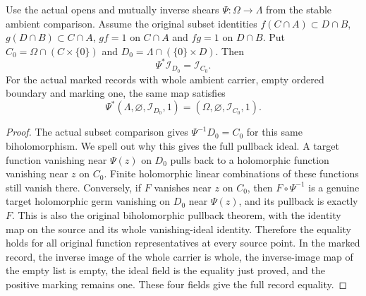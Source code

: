 \begin{lemma}
\label{hir:actual-stable-plane-whole-ideal}
\leanok
Use the actual opens and mutually inverse shears $\Psi:\Omega\to\Lambda$
from the stable ambient comparison. Assume the original subset identities
$f(C\cap A)\subset D\cap B$, $g(D\cap B)\subset C\cap A$, $gf=1$ on
$C\cap A$ and $fg=1$ on $D\cap B$. Put
$C_0=\Omega\cap(C\times\{0\})$ and
$D_0=\Lambda\cap(\{0\}\times D)$. Then
\[
 \Psi^*\mathcal I_{D_0}=\mathcal I_{C_0}.
\]
For the actual marked records with whole ambient carrier, empty ordered
boundary and marking one, the same map satisfies
\[
 \Psi^*(\Lambda,\varnothing,\mathcal I_{D_0},1)
   =(\Omega,\varnothing,\mathcal I_{C_0},1).
\]
\end{lemma}
\begin{proof}
The actual subset comparison gives $\Psi^{-1}D_0=C_0$ for this same
biholomorphism. We spell out why this gives the full pullback ideal.
A target function vanishing near $\Psi(z)$ on $D_0$ pulls back to a
holomorphic function vanishing near $z$ on $C_0$. Finite holomorphic
linear combinations of these functions still vanish there. Conversely,
if $F$ vanishes near $z$ on $C_0$, then $F\circ\Psi^{-1}$ is a genuine
target holomorphic germ vanishing on $D_0$ near $\Psi(z)$, and its
pullback is exactly $F$. This is also the original biholomorphic
pullback theorem, with the identity map on the source and its whole
vanishing-ideal identity. Therefore the equality holds for all original
function representatives at every source point. In the marked record,
the inverse image of the whole carrier is whole, the inverse-image map
of the empty list is empty, the ideal field is the equality just proved,
and the positive marking remains one. These four fields give the full
record equality.
\end{proof}

